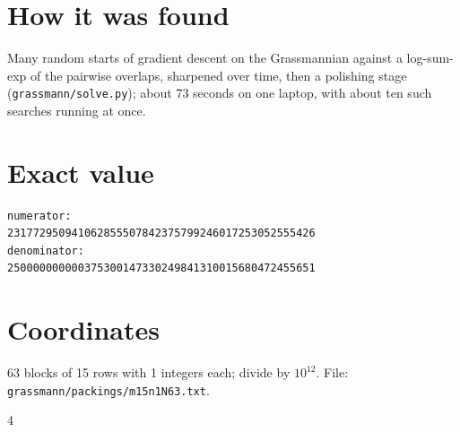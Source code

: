 \documentclass[11pt,a4paper]{article}
\begin{document}
\section{How it was found}
Many random starts of gradient descent on the Grassmannian against a log-sum-exp of the pairwise overlaps, sharpened over time, then a polishing stage (\texttt{grassmann/solve.py}); about 73 seconds on one laptop, with about ten such searches running at once.


\appendix
\section{Exact value}
{\small
\begin{verbatim}
numerator:
231772950941062855507842375799246017253052555426
denominator:
250000000000375300147330249841310015680472455651
\end{verbatim}}

\section{Coordinates}
63 blocks of 15 rows with 1 integers each; divide by $10^{12}$. File: \texttt{grassmann/packings/m15n1N63.txt}.
{\tiny
\begin{multicols}{4}
\end{multicols}}
\end{document}
